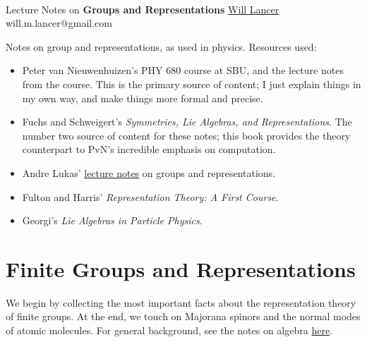 \documentclass[11pt]{article}
\begin{document}
\thispagestyle{empty}
\bigskip \
\vspace{0.1cm}

\begin{center}
{\fontsize{22}{22} \selectfont Lecture Notes on}
\vskip 16pt
{\fontsize{36}{36} \selectfont \bf \sffamily Groups and Representations}
\vskip 24pt
{\fontsize{18}{18} \selectfont \rmfamily \href{https://will-lancer.github.io}{Will Lancer}} 
\vskip 6pt
{\fontsize{14}{14} \selectfont \ttfamily will.m.lancer@gmail.com} 
\vskip 24pt
\end{center}

{\parindent0pt \baselineskip=15.5pt}
\noin
Notes on group and representations, as used in physics. Resources used:
\begin{itemize}
    \item Peter van Nieuwenhuizen's PHY 680 course at SBU,
    and the lecture notes from the course. This is the primary
    source of content; I just explain things in my own way, and
    make things more formal and precise.
    \item Fuchs and Schweigert's \emph{Symmetries, Lie Algebras, and
    Representations}. The number two source of content for these notes;
    this book provides the theory counterpart to PvN's incredible emphasis 
    on computation.
    \item Andre Lukas' 
    \href{https://www-thphys.physics.ox.ac.uk/people/AndreLukas/GroupsandRepresentations/groupsrepslecturenotes.pdf}{lecture notes} 
    on groups and representations.
    \item Fulton and Harris' \emph{Representation Theory: A First Course}.
    \item Georgi's \emph{Lie Algebras in Particle Physics}.
\end{itemize}

\newpage
\microtoc
\newpage


\section{Finite Groups and Representations}

We begin by collecting the most important facts about the representation
theory of finite groups. At the end, we touch on Majorana spinors and the normal
modes of atomic molecules. For general background, see the notes on
algebra \href{https://github.com/will-lancer/notes/blob/main/Mathematics/Algebra/Algebra.pdf}{here}.
\end{document}
